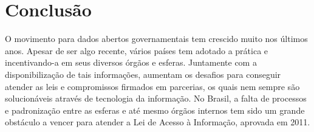 \documentclass[
	12pt,				%
	openright,			%
	twoside,			%
	a4paper,			%
	english,			%
	french,				%
	spanish,			%
	brazil				%
	]{abntex2}
\begin{document}








\chapter{Conclusão}

O movimento para dados abertos governamentais tem crescido muito nos últimos anos. Apesar de ser algo recente, vários países
tem adotado a prática e incentivando-a em seus diversos órgãos e esferas. Juntamente com a disponibilização de tais informações,
aumentam os desafios para conseguir atender as leis e compromissos firmados em parcerias, os quais nem sempre são solucionáveis
através de tecnologia da informação. No Brasil, a falta de processos e padronização entre as esferas e até mesmo órgãos internos
tem sido um grande obstáculo a vencer para atender a Lei de Acesso à Informação, aprovada em 2011.
\end{document}
